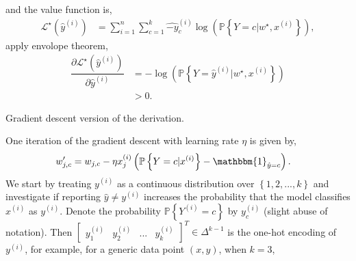 \documentclass{article}
\begin{document}
and the value function is,
\begin{align*}
\mathcal{L}^\star \left(\hat{y} ^{\left(i\right)}\right) &= \displaystyle\sum_{i=1}^{n} \displaystyle\sum_{c=1}^{k} \hat{-y}_{c}^{\left(i\right)} \log\left(\mathbb{P}\left\{Y = c | w^\star , x^{\left(i\right)}\right\}\right),
\end{align*}
apply envolope theorem,
\begin{align*}
\dfrac{\partial \mathcal{L}^\star \left(\hat{y} ^{\left(i\right)}\right)}{\partial \hat{y} ^{\left(i\right)}} &= -\log\left(\mathbb{P}\left\{Y = \hat{y} ^{\left(i\right)} | w^\star , x^{\left(i\right)}\right\}\right)
\\ &> 0.
\end{align*}
\begin{tcolorbox}[colback = white]
Gradient descent version of the derivation.
\end{tcolorbox}
One iteration of the gradient descent with learning rate $\eta$ is given by,
\begin{align*}
w'_{j,c} &= w_{j,c} - \eta x_{j}^{\left(i\right)} \left(\mathbb{P}\left\{Y = c | x^{\left(i\right)}\right\} - \mathbbm{1}_{\hat{y} = c}\right).
\end{align*}
We start by treating $y^{\left(i\right)}$ as a continuous distribution over $\left\{1, 2, ..., k \right\}$ and investigate if reporting $\hat{y} \neq  y^{\left(i\right)}$ increases the probability that the model classifies $x^{\left(i\right)}$ as $y^{\left(i\right)}$. Denote the probability $\mathbb{P}\left\{Y^{\left(i\right)} = c\right\}$ by $y_{c}^{\left(i\right)}$ (slight abuse of notation). Then $\begin{bmatrix} y_{1}^{\left(i\right)} & y_{2}^{\left(i\right)} & ... & y_{k}^{\left(i\right)} \end{bmatrix} ^{T} \in \Delta^{k-1}$ is the one-hot encoding of $y^{\left(i\right)}$, for example, for a generic data point $\left(x , y \right)$, when $k  = 3$,
\end{document}
